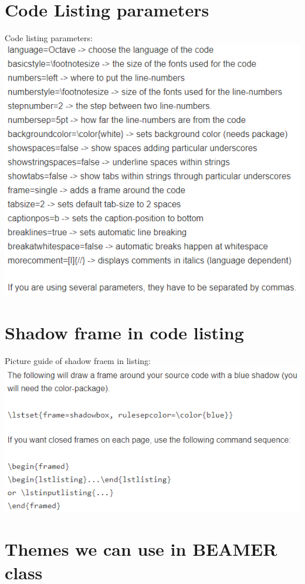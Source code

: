 \documentclass[10 pt]{book}
\begin{document}
\section{Code Listing parameters}
Code listing parameters:\\
\includegraphics[scale=1]{../Code listing parameters.png} 

\section{Shadow frame in code listing}
Picture guide of shadow fraem in listing:\\
\includegraphics[scale=1]{../Shadow frame in code listing.png}

\section{Themes we can use in BEAMER class}
\end{document}
